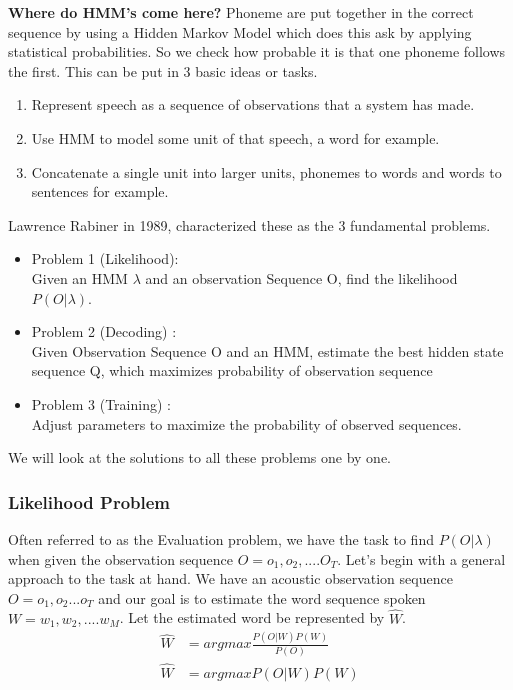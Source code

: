 \documentclass[10pt,twocolumn,letterpaper]{article}
\begin{document}
\textbf{Where do HMM's come here?}
Phoneme are put together in the correct sequence by using a Hidden Markov Model which does this ask by applying statistical probabilities. So we check how probable it is that one phoneme follows the first.  This can be put in 3 basic ideas or tasks.

\begin{enumerate}
    \item Represent speech as a sequence of observations that a system has made.
    \item Use HMM to model some unit of that speech, a word for example.
    \item Concatenate a single unit into larger units, phonemes to words and words to sentences for example.
\end{enumerate}

Lawrence Rabiner in 1989, characterized these as the 3 fundamental problems.
\begin{itemize}
    \item Problem 1 (Likelihood):\\ Given an HMM $\lambda$ and an observation Sequence O, find the likelihood $P(O|\lambda)$. 
    \item Problem 2 (Decoding) : \\
    Given Observation Sequence O and an HMM, estimate the best hidden state sequence Q, which maximizes probability of observation sequence 
    \item Problem 3 (Training) : \\
    Adjust parameters to maximize the probability of observed sequences.
\end{itemize}

We will look at the solutions to all these problems one by one.
\subsubsection{Likelihood Problem}
Often referred to as the Evaluation problem, we have the task to find $P(O|\lambda)$ when given the observation sequence $O = o_1, o_2, .... O_T$. 
Let's begin with a general approach to the task at hand.
We have an acoustic observation sequence $O = o_1, o_2... o_T$ and our goal is to estimate the word sequence spoken $W = w_1, w_2, .... w_M$. Let the estimated word be represented by $\hat{W}$. \\
\begin{align*}
    \hat{W} &= argmax \frac{P(O|W)P(W)}{P(O)} \\
    \hat{W} &= argmax P(O|W)P(W)
\end{align*}
\end{document}

